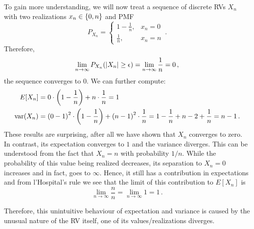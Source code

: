 \begin{ex}
To gain more understanding, we will now treat a sequence of discrete RVs $X_n$ with two realizations $x_n \in \qty{0, n}$ and PMF
\begin{equation*}
P_{X_n} = \begin{cases} 1 - \frac{1}{n}, & x_n = 0 \\ \frac{1}{n}, & x_n = n \end{cases} \, .
\end{equation*}
Therefore,
\begin{equation*}
\lim_{n \rightarrow \infty} P_{X_n}\qty(\abs{X_n} \geq \epsilon) = \lim_{n \rightarrow \infty} \frac{1}{n} = 0 \, ,
\end{equation*}
the sequence converges to $0$. We can further compute:
\begin{align*}
E[X_n] &= 0 \cdot \qty(1 - \frac{1}{n}) + n \cdot \frac{1}{n} = 1
\\
\operatorname{var}(X_n) &= \qty(0 - 1)^2 \cdot \qty(1 - \frac{1}{n}) + \qty(n - 1)^2 \cdot \frac{1}{n} = 1 - \frac{1}{n} + n - 2 + \frac{1}{n} = n - 1 \, .
\end{align*}
These results are surprising, after all we have shown that $X_n$ converges to zero. In contrast, its expectation converges to $1$ and the variance diverges. This can be understood from the fact that $X_n = n$ with probability $1 / n$. While the probability of this value being realized decreases, its separation to $X_n = 0$ increases and in fact, goes to $\infty$. Hence, it still has a contribution in expectations and from l'Hospital's rule we see that the limit of this contribution to $E[X_n]$ is
\begin{equation*}
\lim_{n \rightarrow \infty} \frac{n}{n} = \lim_{n \rightarrow \infty} 1 = 1 \, .
\end{equation*}

Therefore, this unintuitive behaviour of expectation and variance is caused by the unusual nature of the RV itself, one of its values/realizations diverges.

\end{ex}


